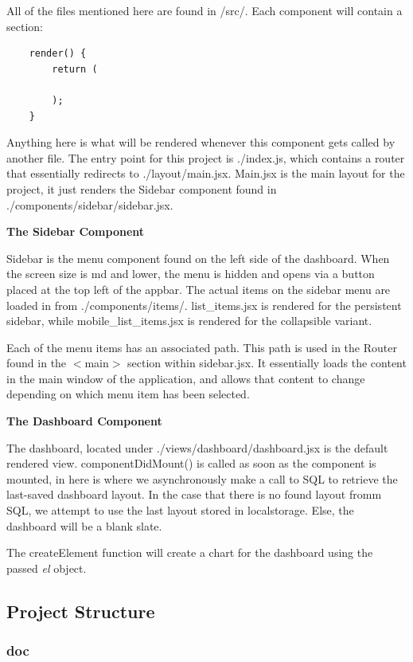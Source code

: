 \documentclass[12pt, titlepage]{article}
\begin{document}
All of the files mentioned here are found in /src/. Each component will contain a section: 
\begin{verbatim}
    render() {
        return (

        );
    }
\end{verbatim}
\noindent Anything here is what will be rendered whenever this component gets called by another file. The entry point for this project is ./index.js, which contains a router that essentially redirects to ./layout/main.jsx. Main.jsx is the main layout for the project, it just renders the Sidebar component found in ./components/sidebar/sidebar.jsx.

\textbf{The Sidebar Component}

\noindent Sidebar is the menu component found on the left side of the dashboard. When the screen size is md and lower, the menu is hidden and opens via a button placed at the top left of the appbar. The actual items on the sidebar menu are loaded in from ./components/items/. list\_items.jsx is rendered for the persistent sidebar, while mobile\_list\_items.jsx is rendered for the collapsible variant.

\noindent Each of the menu items has an associated path. This path is used in the Router found in the $<$main$>$ section within sidebar.jsx. It essentially loads the content in the main window of the application, and allows that content to change depending on which menu item has been selected.

\textbf{The Dashboard Component}

\noindent The dashboard, located under ./views/dashboard/dashboard.jsx is the default rendered view. componentDidMount() is called as soon as the component is mounted, in here is where we asynchronously make a call to SQL to retrieve the last-saved dashboard layout. In the case that there is no found layout fromm SQL, we attempt to use the last layout stored in localstorage. Else, the dashboard will be a blank slate.

\noindent The createElement function will create a chart for the dashboard using the passed \textit{el} object. 


\subsection{Project Structure}
\subsubsection{doc}
\end{document}

